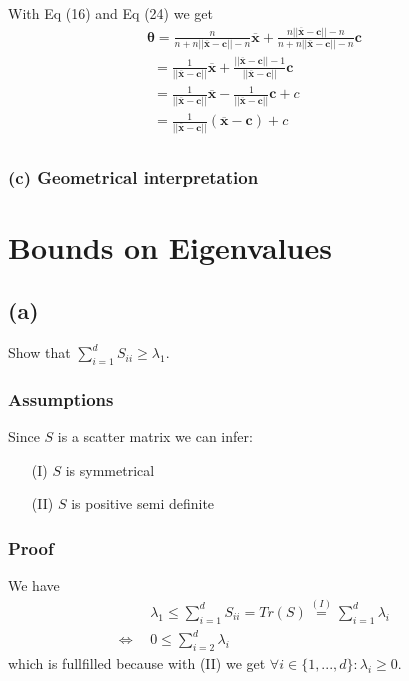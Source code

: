 \documentclass{article}
\begin{document}
With Eq (16) and Eq (24) we get
\begin{align*}
&\boldsymbol{\theta}= \frac{n}{n + n ||\boldsymbol{\overline{x}} - \boldsymbol{c} || - n }\boldsymbol{\overline{x}} + \frac{n ||\boldsymbol{\overline{x}} - \boldsymbol{c} || - n}{n + n ||\boldsymbol{\overline{x}} - \boldsymbol{c} || - n}  \boldsymbol{c}&&\\
&~~= \frac{1}{||\boldsymbol{\overline{x}} - \boldsymbol{c} ||}\boldsymbol{\overline{x}} + \frac{||\boldsymbol{\overline{x}} - \boldsymbol{c} || - 1}{||\boldsymbol{\overline{x}} - \boldsymbol{c} ||}  \boldsymbol{c}&&\\
&~~= \frac{1}{||\boldsymbol{\overline{x}} - \boldsymbol{c} ||}\boldsymbol{\overline{x}}  - \frac{1}{||\boldsymbol{\overline{x}} - \boldsymbol{c} ||}  \boldsymbol{c} + c&&\\
&~~= \frac{1}{||\boldsymbol{\overline{x}} - \boldsymbol{c} ||}(\boldsymbol{\overline{x}}  - \boldsymbol{c}) + c&&\\
\end{align*}
\subsubsection*{(c) Geometrical interpretation}


\section{Bounds on Eigenvalues }
\subsection*{(a)}
Show that $\sum \limits _{i=1}^d S_{ii} \geq \lambda_1$.
\subsubsection*{Assumptions}
Since $S$ is a scatter matrix we can infer:
\begin{itemize}
	\item[(I)] $S$ is symmetrical 
	\item[(II)] $S$ is positive semi definite
\end{itemize}
\subsubsection*{Proof}
We have
\begin{align*}
&\lambda_1 \leq \sum \limits _{i=1}^d S_{ii} = Tr(S) \stackrel{(I)}{=}
\sum \limits _{i=1}^d \lambda_i& \\
\Leftrightarrow~~& 0 \leq  \sum \limits _{i=2}^d \lambda_i&
\end{align*}
which is fullfilled because with (II) we get $\forall i \in \{1,...,d\} : \lambda_i \geq 0$.
\end{document}
